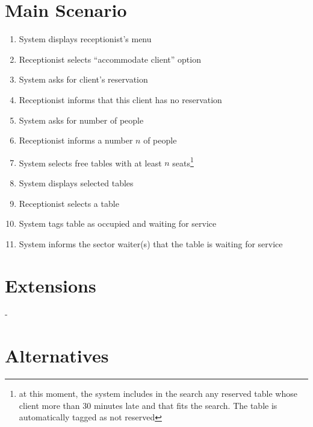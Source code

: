 \documentclass[a4paper,11pt,oneside]{book}
\begin{document}
\section{Main Scenario}

\begin{enumerate}
\item System displays receptionist's menu
\item Receptionist selects ``accommodate client'' option
\item System asks for client's reservation
\item \label{accommodate:noreservation}Receptionist informs that this client has no reservation
\item \label{accommodate:asknumber}System asks for number of people
\item Receptionist informs a number $n$ of people
\item System selects free tables with at least $n$ seats\footnote{at this moment, the system includes in the search any reserved table whose client more than 30 minutes late and that fits the search. The table is automatically tagged as not reserved}
\item System displays selected tables
\item Receptionist selects a table
\item \label{accomodate:tag} System tags table as occupied and waiting for service
\item System informs the sector waiter(s) that the table is waiting for service
\end{enumerate}

\section{Extensions}

-

\section{Alternatives}
\end{document}
